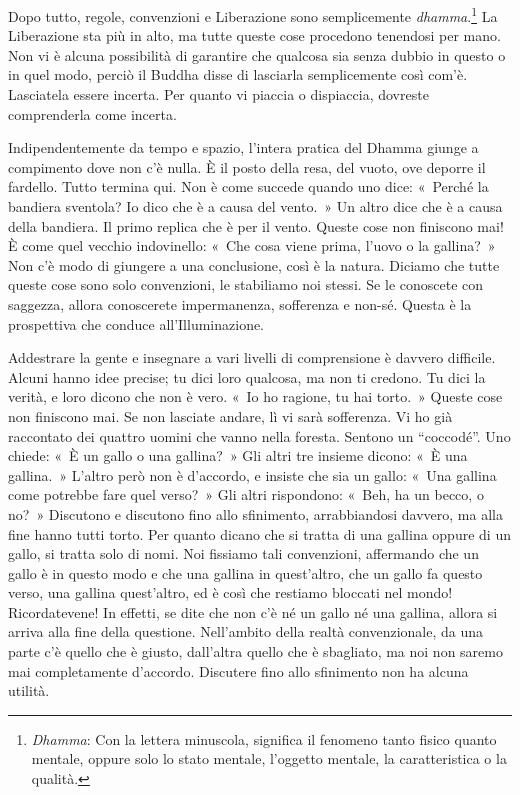Dopo tutto, regole, convenzioni e Liberazione sono semplicemente
\emph{dhamma}.\footnote{\emph{Dhamma}: Con la lettera minuscola,
  significa il fenomeno tanto fisico quanto mentale, oppure solo lo
  stato mentale, l'oggetto mentale, la caratteristica o la qualità.}
La Liberazione sta più in alto, ma tutte queste cose procedono tenendosi
per mano. Non vi è alcuna possibilità di garantire che qualcosa sia
senza dubbio in questo o in quel modo, perciò il Buddha disse di
lasciarla semplicemente così com'è. Lasciatela essere incerta. Per
quanto vi piaccia o dispiaccia, dovreste comprenderla come incerta.

Indipendentemente da tempo e spazio, l'intera pratica del Dhamma giunge
a compimento dove non c'è nulla. È il posto della resa, del vuoto, ove
deporre il fardello. Tutto termina qui. Non è come succede quando uno
dice: «~Perché la bandiera sventola? Io dico che è a causa del vento.~»
Un altro dice che è a causa della bandiera. Il primo replica che è per
il vento. Queste cose non finiscono mai! È come quel vecchio
indovinello: «~Che cosa viene prima, l'uovo o la gallina?~» Non c'è modo
di giungere a una conclusione, così è la natura. Diciamo che tutte
queste cose sono solo convenzioni, le stabiliamo noi stessi. Se le
conoscete con saggezza, allora conoscerete impermanenza, sofferenza e
non-sé. Questa è la prospettiva che conduce all'Illuminazione.

Addestrare la gente e insegnare a vari livelli di comprensione è davvero
difficile. Alcuni hanno idee precise; tu dici loro qualcosa, ma non ti
credono. Tu dici la verità, e loro dicono che non è vero. «~Io ho
ragione, tu hai torto.~» Queste cose non finiscono mai. Se non lasciate
andare, lì vi sarà sofferenza. Vi ho già raccontato dei quattro uomini
che vanno nella foresta. Sentono un ``coccodé''. Uno chiede: «~È un
gallo o una gallina?~» Gli altri tre insieme dicono: «~È una gallina.~»
L'altro però non è d'accordo, e insiste che sia un gallo: «~Una gallina
come potrebbe fare quel verso?~» Gli altri rispondono: «~Beh, ha un
becco, o no?~» Discutono e discutono fino allo sfinimento, arrabbiandosi
davvero, ma alla fine hanno tutti torto. Per quanto dicano che si tratta
di una gallina oppure di un gallo, si tratta solo di nomi. Noi fissiamo
tali convenzioni, affermando che un gallo è in questo modo e che una
gallina in quest'altro, che un gallo fa questo verso, una gallina
quest'altro, ed è così che restiamo bloccati nel mondo! Ricordatevene!
In effetti, se dite che non c'è né un gallo né una gallina, allora si
arriva alla fine della questione. Nell'ambito della realtà
convenzionale, da una parte c'è quello che è giusto, dall'altra quello
che è sbagliato, ma noi non saremo mai completamente d'accordo.
Discutere fino allo sfinimento non ha alcuna utilità.

